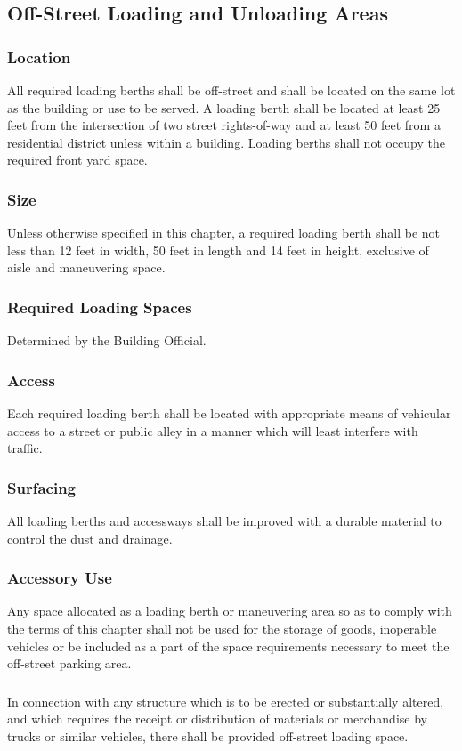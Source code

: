 \subsection{Off-Street Loading and Unloading Areas}
\subsubsection{Location}
All required loading berths shall be off-street and shall be located on the same lot as the building or use to be served. A loading berth shall be located at least 25 feet from the intersection of two street rights-of-way and at least 50 feet from a residential district unless within a building.  Loading berths shall not occupy the required front yard space.
\subsubsection{Size}
Unless otherwise specified in this chapter, a required loading berth shall be not less than 12 feet in width, 50 feet in length and 14 feet in height, exclusive of aisle and maneuvering space.
\subsubsection{Required Loading Spaces}
Determined by the Building Official.
\subsubsection{Access}
Each required loading berth shall be located with appropriate means of vehicular access to a street or public alley in a manner which will least interfere with traffic.
\subsubsection{Surfacing}
All loading berths and accessways shall be improved with a durable material to control the dust and drainage.
\subsubsection{Accessory Use}
Any space allocated as a loading berth or maneuvering area so as to comply with the terms of this chapter shall not be used for the storage of goods, inoperable vehicles or be included as a part of the space requirements necessary to meet the off-street parking area.
\subsubsection{}
In connection with any structure which is to be erected or substantially altered, and which requires the receipt or distribution of materials or merchandise by trucks or similar vehicles, there shall be provided off-street loading space.
